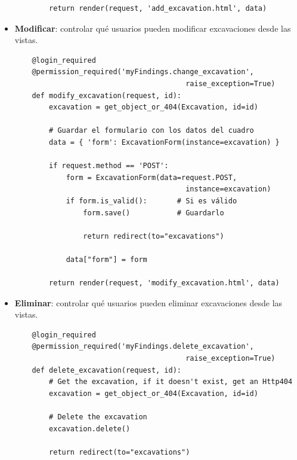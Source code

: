 \begin{itemize}
\begin{verbatim}
        return render(request, 'add_excavation.html', data)
    \end{verbatim}

        \item \textbf{Modificar}: controlar qué usuarios pueden modificar excavaciones
        desde las vistas.
    
    \begin{verbatim}
    @login_required
    @permission_required('myFindings.change_excavation', 
                                        raise_exception=True)
    def modify_excavation(request, id):
        excavation = get_object_or_404(Excavation, id=id)
        
        # Guardar el formulario con los datos del cuadro
        data = { 'form': ExcavationForm(instance=excavation) }
    
        if request.method == 'POST':
            form = ExcavationForm(data=request.POST,
                                        instance=excavation)
            if form.is_valid():       # Si es válido
                form.save()           # Guardarlo
    
                return redirect(to="excavations")
    
            data["form"] = form
    
        return render(request, 'modify_excavation.html', data)
    \end{verbatim}

        \newpage \item \textbf{Eliminar}: controlar qué usuarios pueden eliminar excavaciones
        desde las vistas.
    
    \begin{verbatim}
    @login_required
    @permission_required('myFindings.delete_excavation',
                                        raise_exception=True)
    def delete_excavation(request, id):
        # Get the excavation, if it doesn't exist, get an Http404
        excavation = get_object_or_404(Excavation, id=id)
    
        # Delete the excavation
        excavation.delete()    
    
        return redirect(to="excavations")
    \end{verbatim}
    \end{itemize}

